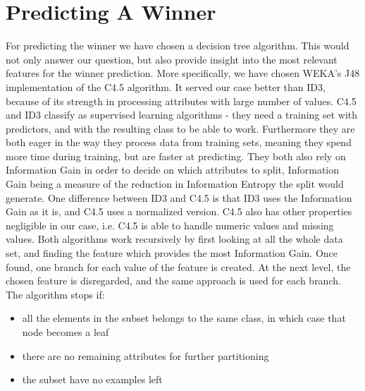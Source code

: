 \documentclass[a4paper,11pt]{article}
\begin{document}
\section{Predicting A Winner}
For predicting the winner we have chosen a decision tree algorithm. This would not only answer our question, but also provide insight into the most relevant features for the winner prediction. More specifically, we have chosen WEKA’s J48 implementation of the C4.5 algorithm. It served our case better than ID3, because of its strength in processing attributes with large number of values.
C4.5 and ID3 classify as supervised learning algorithms - they need a training set with predictors, and with the resulting class to be able to work. Furthermore they are both eager in the way they process data from training sets, meaning they spend more time during training, but are faster at predicting.
They both also rely on Information Gain in order to decide on which attributes to split, Information Gain being a measure of the reduction in Information Entropy the split would generate. One difference between ID3 and C4.5 is that ID3 uses the Information Gain as it is, and C4.5 uses a normalized version. C4.5 also has other properties negligible in our case, i.e. C4.5 is able to handle numeric values and missing values.
Both algorithms work recursively by first looking at all the whole data set, and finding the feature which provides the most Information Gain. Once found, one branch for each value of the feature is created. At the next level, the chosen feature is disregarded, and the same approach is used for each branch. The algorithm stops if:

\begin{itemize}
\item all the elements in the subset belongs to the same class, in which case that node becomes a leaf
\item there are no remaining attributes for further partitioning
\item the subset have no examples left
\end{itemize}
\end{document}
